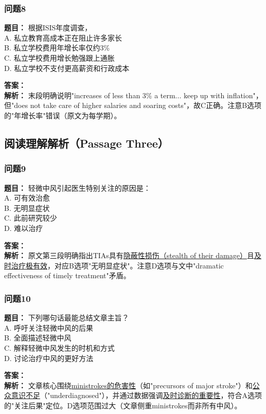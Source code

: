 \documentclass{article}
\begin{document}
\subsubsection*{问题8}
\textbf{题目：} 根据ISIS年度调查，\\
A. 私立教育高成本正在阻止许多家长 \\
B. 私立学校费用年增长率仅约3\% \\
C. 私立学校费用增长勉强跟上通胀 \\
D. 私立学校不支付更高薪资和行政成本

\textbf{答案：}  \\
\textbf{解析：} 末段明确说明"increases of less than 3\% a term... keep up with inflation"，但"does not take care of higher salaries and soaring costs"，故C正确。注意B选项的"年增长率"错误（原文为每学期）。

\subsection*{阅读理解解析（Passage Three）}

\subsubsection*{问题9}
\textbf{题目：} 轻微中风引起医生特别关注的原因是：\\
A. 可有效治愈 \\
B. 无明显症状 \\
C. 此前研究较少 \\
D. 难以治疗

\textbf{答案：}  \\
\textbf{解析：} 原文第三段明确指出TIAs具有\underline{隐蔽性损伤（stealth of their damage）}且\underline{及时治疗极有效}，对应B选项"无明显症状"。注意D选项与文中"dramatic effectiveness of timely treatment"矛盾。

\subsubsection*{问题10}
\textbf{题目：} 下列哪句话最能总结文章主旨？\\
A. 呼吁关注轻微中风的后果 \\
B. 全面描述轻微中风 \\
C. 解释轻微中风发生的时机和方式 \\
D. 讨论治疗中风的更好方法

\textbf{答案：}  \\
\textbf{解析：} 文章核心围绕\underline{ministrokes的危害性}（如"precursors of major stroke"）和\underline{公众意识不足}（"underdiagnosed"），并通过数据强调\underline{及时诊断的重要性}，符合A选项的"关注后果"定位。D选项范围过大（文章侧重ministrokes而非所有中风）。
\end{document}
